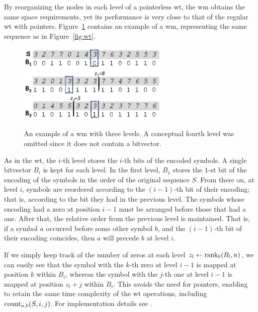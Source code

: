\documentclass[a4paper,10pt,twoside]{book}
\begin{document}
    By reorganizing the nodes in each level of a pointerless \gls{wt}, the \acrfull{wm} \cite{CNO15} obtains the  same space requirements, yet its performance is very close 
    to that of the regular \gls{wt} with pointers. Figure~\ref{fig:wm} contains an example of a \gls{wm}, representing the same sequence as in Figure~\ref{fig:wt}.
    
    \begin{figure}[ht]
	\begin{center}
		{\includegraphics[width=0.65\textwidth]{figures/wm1.eps}}
	\end{center}
	\caption{An example of a \acrlong{wm} with three levels. A conceptual fourth level was omitted since it does not contain a bitvector.}
	\label{fig:wm}
	\end{figure}
    
    As in the \gls{wt}, the $i$-th level stores the $i$-th bits of the encoded symbols. 
    A single bitvector $B_i$ is kept for each level. In the first level, $B_1$ stores the
    $1$-st bit of the encoding of the symbols in the order of the original sequence $S$.
    From there on, at level $i$, symbols are reordered according to the $(i-1)$-th bit of their encoding; 
    that is, according to the bit they had in the previous level.
    The symbols whose encoding had a zero at position $i-1$ must be arranged before those that
    had a one. After that, the relative order from the previous level is maintained. That is, if 
    a symbol $a$ occurred before some other symbol $b$, and the $(i-1)$-th bit of their encoding
    coincides, then $a$ will precede $b$ at level $i$. %
    
    If we simply keep track of the number of zeros at each level $z_l\leftarrow \operatorname{rank}_0(B_l,n)$, we can easily see that the symbol with the $k$-th zero
    at level $i-1$ is mapped at position $k$ within $B_i$, whereas the symbol with the $j$-th one at level $i-1$ is 
    mapped at position $z_l +j$ within $B_i$. This avoids the need for pointers, enabling to retain
    the same time complexity of the \gls{wt} operations, including $\operatorname{count}_{a,b}(S,i,j)$. For 
    implementation details see \cite{CNO15,ordonez2015statistical}. 
    
\end{document}
